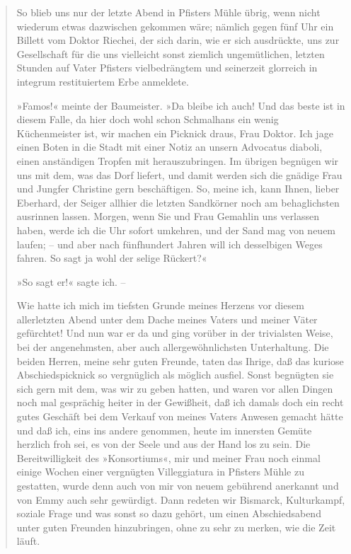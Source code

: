 \begin{verse}
So blieb uns nur der letzte Abend in Pfisters Mühle übrig, wenn
nicht wiederum etwas dazwischen gekommen wäre; nämlich gegen fünf
Uhr ein Billett vom Doktor Riechei, der sich darin, wie er sich
ausdrückte, uns zur Gesellschaft für die uns vielleicht sonst
ziemlich ungemütlichen, letzten Stunden auf Vater Pfisters
vielbedrängtem und seinerzeit glorreich in integrum restituiertem
Erbe anmeldete.

»Famos!« meinte der Baumeister. »Da bleibe ich auch! Und das beste
ist in diesem Falle, da hier doch wohl schon Schmalhans ein wenig
Küchenmeister ist, wir machen ein Picknick draus, Frau Doktor. Ich
jage einen Boten in die Stadt mit einer Notiz an unsern Advocatus
diaboli, einen anständigen Tropfen mit herauszubringen. Im übrigen
begnügen wir uns mit dem, was das Dorf liefert, und damit werden
sich die gnädige Frau und Jungfer Christine gern beschäftigen. So,
meine ich, kann Ihnen, lieber Eberhard, der Seiger allhier die
letzten Sandkörner noch am behaglichsten ausrinnen lassen. Morgen,
wenn Sie und Frau Gemahlin uns verlassen haben, werde ich die Uhr
sofort umkehren, und der Sand mag von neuem laufen; – und aber nach
fünfhundert Jahren will ich desselbigen Weges fahren. So sagt ja
wohl der selige Rückert?«

»So sagt er!« sagte ich. –

Wie hatte ich mich im tiefsten Grunde meines Herzens vor diesem
allerletzten Abend unter dem Dache meines Vaters und meiner Väter
gefürchtet! Und nun war er da und ging vorüber in der trivialsten
Weise, bei der angenehmsten, aber auch allergewöhnlichsten
Unterhaltung. Die beiden Herren, meine sehr guten Freunde, taten
das Ihrige, daß das kuriose Abschiedspicknick so vergnüglich als
möglich ausfiel. Sonst begnügten sie sich gern mit dem, was wir zu
geben hatten, und waren vor allen Dingen noch mal gesprächig heiter
in der Gewißheit, daß ich damals doch ein recht gutes Geschäft bei
dem Verkauf von meines Vaters Anwesen gemacht hätte und daß ich,
eins ins andere genommen, heute im innersten Gemüte herzlich froh
sei, es von der Seele und aus der Hand los zu sein. Die
Bereitwilligkeit des »Konsortiums«, mir und meiner Frau noch einmal
einige Wochen einer vergnügten Villeggiatura in Pfisters Mühle zu
gestatten, wurde denn auch von mir von neuem gebührend anerkannt
und von Emmy auch sehr gewürdigt. Dann redeten wir Bismarck,
Kulturkampf, soziale Frage und was sonst so dazu gehört, um einen
Abschiedsabend unter guten Freunden hinzubringen, ohne zu sehr zu
merken, wie die Zeit läuft.


\end{verse}
